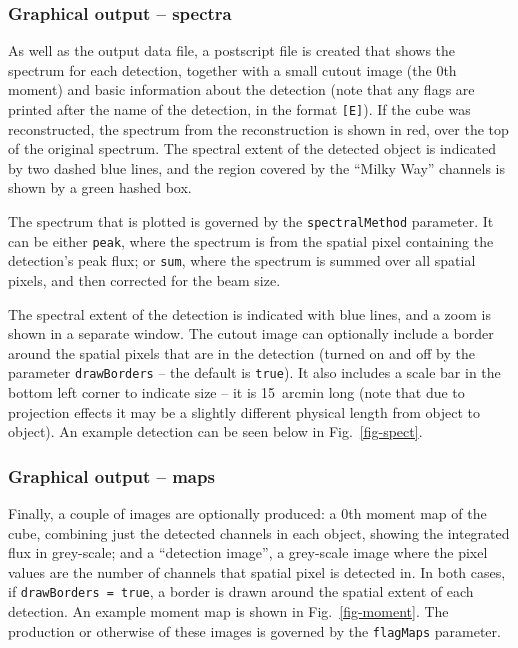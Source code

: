 \documentclass[12pt,a4paper]{article}
\begin{document}
\subsubsection{Graphical output -- spectra}

As well as the output data file, a postscript file is created that
shows the spectrum for each detection, together with a small cutout
image (the 0th moment) and basic information about the detection (note
that any flags are printed after the name of the detection, in the
format \texttt{[E]}). If the cube was reconstructed, the spectrum from
the reconstruction is shown in red, over the top of the original
spectrum. The spectral extent of the detected object is indicated by
two dashed blue lines, and the region covered by the ``Milky Way''
channels is shown by a green hashed box.

The spectrum that is plotted is governed by the
\texttt{spectralMethod} parameter. It can be either \texttt{peak},
where the spectrum is from the spatial pixel containing the
detection's peak flux; or \texttt{sum}, where the spectrum is summed
over all spatial pixels, and then corrected for the beam size.

The spectral extent of the detection is indicated with blue lines, and
a zoom is shown in a separate window. The cutout image can optionally
include a border around the spatial pixels that are in the detection
(turned on and off by the parameter \texttt{drawBorders} -- the
default is \texttt{true}). It also includes a scale bar in the bottom
left corner to indicate size -- it is 15~arcmin long (note that due to
projection effects it may be a slightly different physical length from
object to object). An example detection can be seen below in
Fig.~\ref{fig-spect}.

\subsubsection{Graphical output -- maps}

Finally, a couple of images are optionally produced: a 0th moment map
of the cube, combining just the detected channels in each object,
showing the integrated flux in grey-scale; and a ``detection image'',
a grey-scale image where the pixel values are the number of channels
that spatial pixel is detected in. In both cases, if
\texttt{drawBorders = true}, a border is drawn around the spatial
extent of each detection. An example moment map is shown in
Fig.~\ref{fig-moment}.  The production or otherwise of these images is
governed by the \texttt{flagMaps} parameter.
\end{document}
